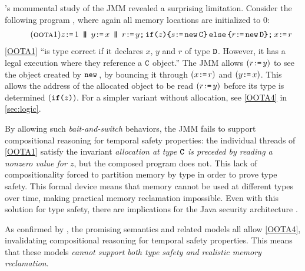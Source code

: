 \citeauthor{DBLP:journals/toplas/Lochbihler13}'s
monumental study of the JMM
revealed a surprising limitation. Consider the following program
\citep[Fig.~8]{DBLP:journals/toplas/Lochbihler13}, where again
all memory locations are initialized to $0$:
\begin{gather}
  \taglabel{OOTA1}
  z \GETS 1
  \PAR %
  y\GETS x
  \PAR
  \aReg\GETS y \SEMI \IF{z} \THEN \bReg \GETS \NEW \classC \ELSE \aReg \GETS \NEW \classD \FI  \SEMI x \GETS \aReg 
\end{gather}
\ref{OOTA1} ``is type correct if it declares $x$, $y$ and $r$ of type
$\mathtt{D}$. However, it has a legal execution where they reference a $\mathtt{C}$
object.''  The JMM allows $(r\texttt{:}\mkern-1mu\texttt{=}\, y)$ to see the object created by
$\texttt{new}\,$, by bouncing it through $(x \texttt{:}\mkern-1mu\texttt{=}\, r)$ and $(y\texttt{:}\mkern-1mu\texttt{=}\, x)$.  This
allows the address of the allocated object to be read $(r\texttt{:}\mkern-1mu\texttt{=}\, y)$ before
its type is determined $(\texttt{if}\allowbreak\texttt{(}z\texttt{)})$.  For a simpler variant without
allocation, see \ref{OOTA4} in \textsection\ref{sec:logic}.

By allowing such \emph{bait-and-switch} behaviors, the JMM fails to support
compositional reasoning for temporal safety properties:  the individual
threads of \ref{OOTA1} satisfy the invariant
\emph{allocation at type $\mathtt{C}$ is preceded by reading a nonzero value for
  $z$}, but the composed program does not.  This lack of compositionality
forced \citeauthor{DBLP:journals/toplas/Lochbihler13} to partition memory by
type in order to prove type safety.  This formal device means that memory
cannot be used at different types over time, making practical memory
reclamation impossible.  Even with this solution for type safety, there are
implications for the Java security architecture
\cite[]{DBLP:journals/toplas/Lochbihler13}.


As confirmed by \cite{kang,soham}, the promising semantics
\cite{DBLP:conf/popl/KangHLVD17} and related models
\citep{DBLP:conf/esop/JagadeesanPR10,DBLP:journals/pacmpl/ChakrabortyV19} all
allow \ref{OOTA4}, invalidating compositional reasoning for temporal safety
properties.
This means that these models \emph{cannot support both type safety and
  realistic memory reclamation}.


